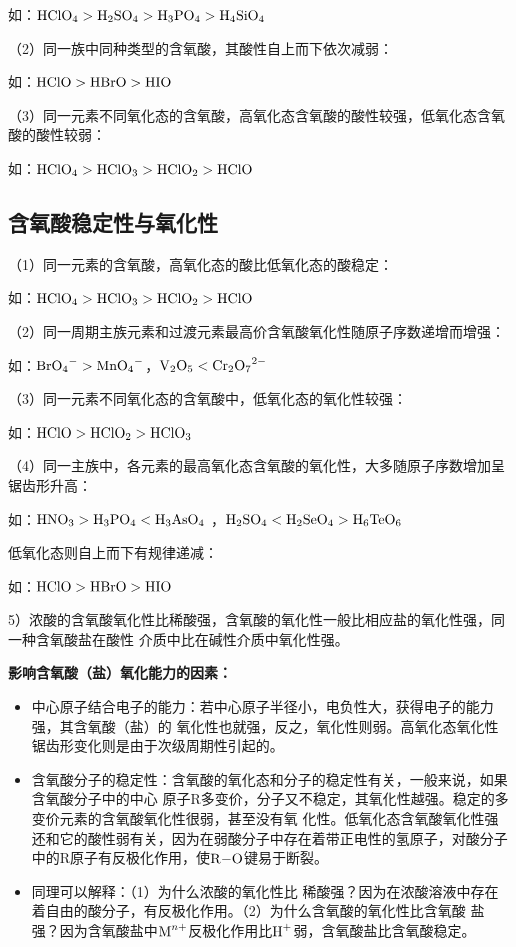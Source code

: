 \documentclass[
  10pt,
  twoside,
  openany,
  b5paper, %
  colorscheme = basic, %
  xits = false,
]{qyxf-book}
\begin{document}
如：$\ce{HClO4} > \ce{H2SO4} > \ce{H3PO4} > \ce{H4SiO4} $

（2）同一族中同种类型的含氧酸，其酸性自上而下依次减弱：

如：$\ce{HClO} > \ce{HBrO} > \ce{HIO}  $

（3）同一元素不同氧化态的含氧酸，高氧化态含氧酸的酸性较强，低氧化态含氧酸的酸性较弱：

如：$\ce{HClO4} > \ce{HClO3} > \ce{HClO2} > \ce{HClO} $
 

\subsection{含氧酸稳定性与氧化性}

（1）同一元素的含氧酸，高氧化态的酸比低氧化态的酸稳定：

如：$\ce{HClO4} > \ce{HClO3} > \ce{HClO2} > \ce{HClO} $

（2）同一周期主族元素和过渡元素最高价含氧酸氧化性随原子序数递增而增强：

如：$\ce{BrO4^-}>\ce{MnO4^-}$，$\ce{V2O5} < \ce{Cr2O7^2-}$

（3）同一元素不同氧化态的含氧酸中，低氧化态的氧化性较强：

如：$\ce{HClO} > \ce{HClO2} > \ce{HClO3} $

（4）同一主族中，各元素的最高氧化态含氧酸的氧化性，大多随原子序数增加呈锯齿形升高：

如：$\ce{HNO3} > \ce{H3PO4} < \ce{H3AsO4}$ ，$\ce{H2SO4} < \ce{H2SeO4} > \ce{H6TeO6}$ 

低氧化态则自上而下有规律递减：

如：$\ce{HClO} > \ce{HBrO} > \ce{HIO} $

5）浓酸的含氧酸氧化性比稀酸强，含氧酸的氧化性一般比相应盐的氧化性强，同一种含氧酸盐在酸性
介质中比在碱性介质中氧化性强。

\begin{note}
	\textbf{影响含氧酸（盐）氧化能力的因素：}
	
	\begin{itemize}
		\item 中心原子结合电子的能力：若中心原子半径小，电负性大，获得电子的能力强，其含氧酸（盐）的
		氧化性也就强，反之，氧化性则弱。高氧化态氧化性锯齿形变化则是由于次级周期性引起的。
		\item 含氧酸分子的稳定性：含氧酸的氧化态和分子的稳定性有关，一般来说，如果含氧酸分子中的中心
		原子R多变价，分子又不稳定，其氧化性越强。稳定的多变价元素的含氧酸氧化性很弱，甚至没有氧
		化性。低氧化态含氧酸氧化性强还和它的酸性弱有关，因为在弱酸分子中存在着带正电性的氢原子，对酸分子中的R原子有反极化作用，使$\ce{R-O}$键易于断裂。
		\item 同理可以解释：（1）为什么浓酸的氧化性比
		稀酸强？因为在浓酸溶液中存在着自由的酸分子，有反极化作用。（2）为什么含氧酸的氧化性比含氧酸
		盐强？因为含氧酸盐中$\ce{ M^n+}$反极化作用比$\ce{H+}$弱，含氧酸盐比含氧酸稳定。
	\end{itemize}
\end{note}
\end{document}
